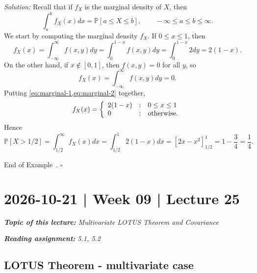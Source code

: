\documentclass[10pt]{article}
\theoremstyle{definition}
\newtheorem{example}[theorem]{Example}
\renewenvironment{example}
{\begin{oldexample}}
  {\par\smallskip\hfill   End of Example~\theexample. $\square$    \par\end{oldexample}}
\newcommand{\1}[1]{\textbf{1}_{\left[#1\right]}} %
\def\P{\mathbb{P}} %
\begin{document}
\begin{example}
\begin{enumerate}[(a)]
    \textit{Solution:} Recall that if $f_{X}$ is the marginal density of $X$,
    then
    \begin{equation*}
      \int_{a}^{b} f_{X}(x)dx =  \P[a \leq X \leq b], \qquad -\infty \leq a \leq b \leq \infty.
    \end{equation*}
    We start by computing the marginal density $f_{X}$.
    If $0 \leq x \leq 1$, then
    \begin{equation}\label{eq:marginal-1}
      f_{X}(x) = \int_{-\infty}^{\infty}f(x,y)dy = \int_{0}^{1-x}f(x,y)dy = \int_{0}^{1-x}2dy  =2(1-x).
    \end{equation}
    On the other hand, if $x\notin [0,1]$, then $f(x,y)=0$ for all $y$, so
    \begin{equation}\label{eq:marginal-2}
      f_{X}(x) = \int_{-\infty}^{\infty}f(x,y)dy =0. 
    \end{equation}
    Putting \cref{eq:marginal-1,eq:marginal-2} together,
    \begin{equation*}
      f_{X}(x) = \left\{ \begin{array}{l@{\quad:\quad}l} 2(1-x) & 0 \leq x \leq 1\\ 0 & \text{otherwise}.\end{array}\right.
    \end{equation*}
    Hence
    \begin{equation*}
      \P[X>1/2] = \int_{1/2}^{\infty}f_{X}(x)dx = \int_{1/2}^{1}2(1-x)dx =\left[ 2x-x^{2} \right]_{1/2}^{1}= 1 - \frac{3}{4}= \frac{1}{4}. 
    \end{equation*}

  \end{enumerate}
\end{example}

\newpage
\section{2026-10-21 | Week 09 | Lecture 25}

\begin{center}
  \begin{tcolorbox}[width=0.9\textwidth, colback=white, colframe=black]
    \textit{\textbf{Topic of this lecture:} Multivariate LOTUS Theorem and Covariance}

    \textit{\textbf{Reading assignment:} 5.1, 5.2}
  \end{tcolorbox}
\end{center}

\subsection{LOTUS Theorem - multivariate case}
\end{document}

